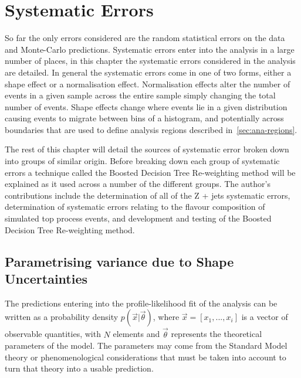 \chapter{Systematic Errors}%
\label{ch:systematics}

So far the only errors considered are the random statistical errors on the data
and Monte-Carlo predictions. Systematic errors enter into the analysis in a
large number of places, in this chapter the systematic errors considered in the
analysis are detailed. In general the systematic errors come in one of two
forms, either a shape effect or a normalisation effect. Normalisation effects
alter the number of events in a given sample across the entire sample simply
changing the total number of events. Shape effects change where events lie in a
given distribution causing events to migrate between bins of a histogram, and
potentially across boundaries that are used to define analysis regions described
in~\ref{sec:ana-regions}.

The rest of this chapter will detail the sources of systematic error broken down
into groups of similar origin. Before breaking down each group of systematic
errors a technique called the Boosted Decision Tree Re-weighting method will be
explained as it used across a number of the different groups. The author's
contributions include the determination of all of the Z + jets systematic
errors, determination of systematic errors relating to the flavour composition
of simulated top process events, and development and testing of the Boosted
Decision Tree Re-weighting method.

\section{Parametrising variance due to Shape Uncertainties}
\label{sec:re-weighting}

The predictions entering into the profile-likelihood fit of the analysis can be
written as a probability density $p(\vec{x}|\vec{\theta})$, where $\vec{x} =
[x_{1},..., x_{i}]$ is a vector of observable quantities, with $N$ elements and
$\vec{\theta}$ represents the theoretical parameters of the model. The
parameters may come from the Standard Model theory or phenomenological
considerations that must be taken into account to turn that theory into a usable
prediction.

